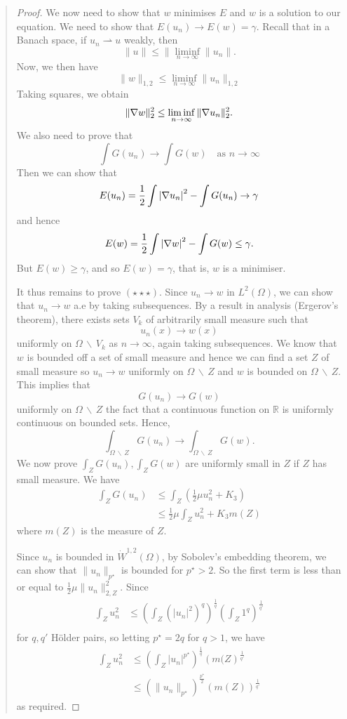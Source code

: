 \documentclass[10pt, oneside, reqno]{amsart}
\theoremstyle{plain}%
\numberwithin{equation}{section}
\theoremstyle{definition}
\theoremstyle{remark}
\newcommand{\R}{\mathbb{R}}
\begin{document}
\begin{quote}
\begin{proof}
	We now need to show that $w$ minimises $E$ and $w$ is a solution to our equation.  We need to show that $E(u_n) \rightarrow E(w) = \gamma$. 
	Recall that in a Banach space, if $u_n \rightharpoonup u$ weakly, then \[
		\| u \| \leq \| \liminf_{n \rightarrow \infty} \| u_n \|.
	\]
	Now, we then have \[
		\| w \|_{1, 2} \leq \liminf_{n \rightarrow \infty}  \| u_n \|_{1, 2}
	\]  Taking squares, we obtain \[
		\| \nabla w \|_2^2 \leq \liminf_{n \rightarrow \infty} \| \nabla u_n \|_2^2.
	\]  We also need to prove that \[
		\tag{$\star \star \star$}
		\int G(u_n) \rightarrow \int G(w) \quad \text{as $n \rightarrow \infty$}
	\]  Then we can show that \[
		E(u_n) = \frac{1}{2} \int \left| \nabla u_n \right|^2 - \int G(u_n)  \rightarrow \gamma 
	\] and hence \[
		E(w) = \frac{1}{2} \int \left| \nabla w \right|^2 - \int G(w)  \leq \gamma.
	\] But $E(w) \geq \gamma$, and so $E(w) = \gamma$, that is, $w$ is a minimiser.
	
	It thus remains to prove $(\star \star \star)$.  Since $u_n \rightarrow w$ in $L^2(\Omega)$, we can show that $u_n \rightarrow w$ a.e by taking subsequences.  By a result in analysis (Ergerov's theorem), there exists sets $V_k$ of arbitrarily small measure such that \[
		u_n(x) \rightarrow w(x)
	\] uniformly on $\Omega \, \backslash \, V_k$ as $n \rightarrow \infty$, again taking subsequences.  We know that $w$ is bounded off a set of  small measure and hence we can find a set $Z$ of small measure so $u_n \rightarrow w$ uniformly on $\Omega \, \backslash \, Z$ and $w$ is bounded on $\Omega \, \backslash \, Z$.  This implies that \[
		G(u_n) \rightarrow G(w)
	\]  uniformly on $\Omega \, \backslash \, Z$ the fact that a continuous function on $\R$ is uniformly continuous on bounded sets.  Hence, \[
		\int_{\Omega \, \backslash \, Z} G(u_n) \rightarrow \int_{\Omega \, \backslash \, Z} G(w).
	\]  We now prove $\int_Z G(u_n), \int_Z G(w)$ are uniformly small in $Z$ if $Z$ has small measure.  We have \begin{align*}
		\int_Z G(u_n) &\leq \int_Z \left(\frac{1}{2} \mu u_n^2 + K_3 \right) \\
					&\leq  \frac{1}{2} \mu \int_Z u_n^2 + K_3 m(Z) 
	\end{align*} where $m(Z)$ is the measure of $Z$.
	
	 Since $u_n$ is bounded in $\dot W^{1, 2}(\Omega)$, by Sobolev's embedding theorem, we can show that $\| u_n \|_{p^\star}$ is bounded for $p^\star > 2$.  So the first term is less than or equal to $\frac{1}{2}\mu \| u_n \|_{2, Z}^2$.  Since \begin{align*}
		\int_Z u_n^2 &\leq \left( \int_Z \left(|u_n|^2\right)^{q} \right)^\frac{1}{q} \left( \int_Z 1^q \right)^\frac{1}{q'} \\
	\end{align*}  for $q, q'$ H\"older pairs, so letting $p^\star = 2q$ for $q > 1$, we have \begin{align*}
		\int_Z u_n^2 &\leq \left( \int_Z |u_n|^{p^\star}\right)^{\frac{1}{q}} \left(m(Z \right)^{\frac{1}{q'}} \\
		&\leq  \left( \| u_n \|_{p^\star} \right)^{\frac{p^\star}{2}} \left( m(Z) \right)^{\frac{1}{q'}}
	\end{align*} as required.
	

\end{proof}
\end{quote}
\end{document}
